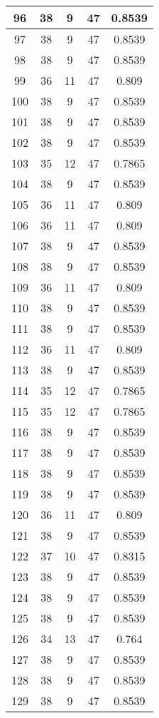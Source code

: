 \documentclass[letterpaper, 12pt]{article}
\begin{document}
\begin{longtable}{|c|c|c|c|c|}
\hline
96 & 38 & 9 & 47 & 0.8539 \\
\hline
97 & 38 & 9 & 47 & 0.8539 \\
\hline
98 & 38 & 9 & 47 & 0.8539 \\
\hline
99 & 36 & 11 & 47 & 0.809 \\
\hline
100 & 38 & 9 & 47 & 0.8539 \\
\hline
101 & 38 & 9 & 47 & 0.8539 \\
\hline
102 & 38 & 9 & 47 & 0.8539 \\
\hline
103 & 35 & 12 & 47 & 0.7865 \\
\hline
104 & 38 & 9 & 47 & 0.8539 \\
\hline
105 & 36 & 11 & 47 & 0.809 \\
\hline
106 & 36 & 11 & 47 & 0.809 \\
\hline
107 & 38 & 9 & 47 & 0.8539 \\
\hline
108 & 38 & 9 & 47 & 0.8539 \\
\hline
109 & 36 & 11 & 47 & 0.809 \\
\hline
110 & 38 & 9 & 47 & 0.8539 \\
\hline
111 & 38 & 9 & 47 & 0.8539 \\
\hline
112 & 36 & 11 & 47 & 0.809 \\
\hline
113 & 38 & 9 & 47 & 0.8539 \\
\hline
114 & 35 & 12 & 47 & 0.7865 \\
\hline
115 & 35 & 12 & 47 & 0.7865 \\
\hline
116 & 38 & 9 & 47 & 0.8539 \\
\hline
117 & 38 & 9 & 47 & 0.8539 \\
\hline
118 & 38 & 9 & 47 & 0.8539 \\
\hline
119 & 38 & 9 & 47 & 0.8539 \\
\hline
120 & 36 & 11 & 47 & 0.809 \\
\hline
121 & 38 & 9 & 47 & 0.8539 \\
\hline
122 & 37 & 10 & 47 & 0.8315 \\
\hline
123 & 38 & 9 & 47 & 0.8539 \\
\hline
124 & 38 & 9 & 47 & 0.8539 \\
\hline
125 & 38 & 9 & 47 & 0.8539 \\
\hline
126 & 34 & 13 & 47 & 0.764 \\
\hline
127 & 38 & 9 & 47 & 0.8539 \\
\hline
128 & 38 & 9 & 47 & 0.8539 \\
\hline
129 & 38 & 9 & 47 & 0.8539 \\

\end{longtable}
\end{document}
